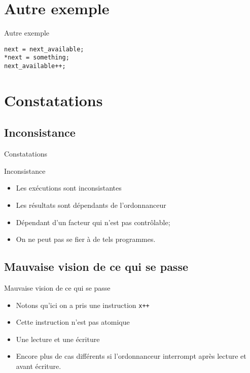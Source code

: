 \def\sectitle{Autre exemple}
\section{\sectitle}
\begin{frame}[containsverbatim]{\sectitle}
\begin{exampleblock}{\subsectitle}
\begin{verbatim}
next = next_available;
*next = something;
next_available++;
\end{verbatim}
\end{exampleblock}
\end{frame}


\def\sectitle{Constatations}
\section{\sectitle}
\def\subsectitle{Inconsistance}
\subsection{\subsectitle}
\begin{frame}{\sectitle}
\begin{block}{\subsectitle}
\begin{itemize}
\item Les exécutions sont inconsistantes
\item Les résultats sont dépendants de l'ordonnanceur
\item Dépendant d'un facteur qui n'est pas contrôlable;
\item On ne peut pas se fier à de tels programmes.
\end{itemize}
\end{block}

\def\subsectitle{Mauvaise vision de ce qui se passe}
\subsection{\subsectitle}
\begin{alertblock}{\subsectitle}
\begin{itemize}
    \item Notons qu'ici on a pris une instruction \texttt{x++}
    \item Cette instruction n'est pas atomique
    \item Une lecture et une écriture
    \item Encore plus de cas différents si l'ordonnanceur interrompt après
    lecture et avant écriture.
\end{itemize}
\end{alertblock}

\end{frame}


